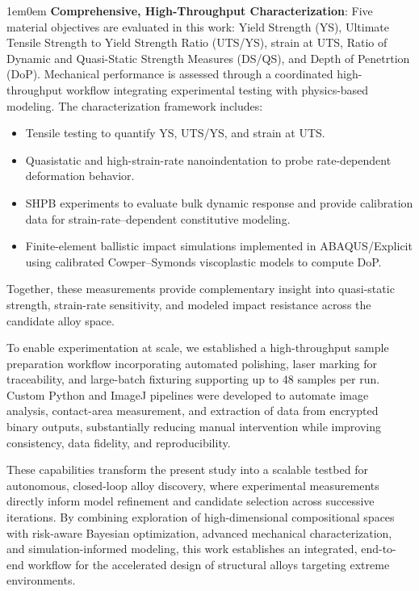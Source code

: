 
     

\begin{adjustwidth}{1em}{0em}
\textbf{Comprehensive, High-Throughput Characterization}: Five material objectives are evaluated in this work: Yield Strength (YS), Ultimate Tensile Strength to Yield Strength Ratio (UTS/YS), strain at UTS, Ratio of Dynamic and Quasi-Static Strength Measures (DS/QS), and Depth of Penetrtion (DoP). Mechanical performance is assessed through a coordinated high-throughput workflow integrating experimental testing with physics-based modeling. The characterization framework includes:
\begin{itemize}
    \item Tensile testing to quantify YS, UTS/YS, and strain at UTS.
    \item Quasistatic and high-strain-rate nanoindentation to probe rate-dependent deformation behavior.
    \item SHPB experiments to evaluate bulk dynamic response and provide calibration data for strain-rate–dependent constitutive modeling.
    \item Finite-element ballistic impact simulations implemented in ABAQUS/Explicit using calibrated Cowper--Symonds viscoplastic models to compute DoP.
\end{itemize}
Together, these measurements provide complementary insight into quasi-static strength, strain-rate sensitivity, and modeled impact resistance across the candidate alloy space.
\end{adjustwidth}

To enable experimentation at scale, we established a high-throughput sample preparation workflow incorporating automated polishing, laser marking for traceability, and large-batch fixturing supporting up to 48 samples per run. Custom Python and ImageJ pipelines were developed to automate image analysis, contact-area measurement, and extraction of data from encrypted binary outputs, substantially reducing manual intervention while improving consistency, data fidelity, and reproducibility.

These capabilities transform the present study into a scalable testbed for autonomous, closed-loop alloy discovery, where experimental measurements directly inform model refinement and candidate selection across successive iterations. By combining exploration of high-dimensional compositional spaces with risk-aware Bayesian optimization, advanced mechanical characterization, and simulation-informed modeling, this work establishes an integrated, end-to-end workflow for the accelerated design of structural alloys targeting extreme environments.

